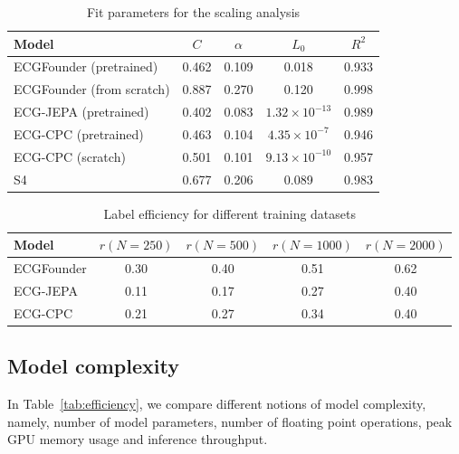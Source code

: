 \documentclass{article}
\begin{document}
        \begin{table}[htbp]
            \centering
            \caption{Fit parameters for the scaling analysis}
            \begin{tabular}{lcccc}
                \toprule
                Model & $C$ & $\alpha$ & $L_0$ & $R^2$ \\
                \midrule
                ECGFounder (pretrained) & 0.462 & 0.109 & 0.018 & 0.933 \\
                ECGFounder (from scratch) & 0.887 & 0.270 & 0.120 & 0.998 \\
                ECG-JEPA (pretrained) & 0.402 & 0.083 & $1.32 \times 10^{-13}$ & 0.989 \\
                ECG-CPC (pretrained) & 0.463 & 0.104 & $4.35 \times 10^{-7}$ & 0.946 \\
                ECG-CPC (scratch) & 0.501 & 0.101 & $9.13 \times 10^{-10}$ & 0.957 \\
                S4 & 0.677 & 0.206 & 0.089 & 0.983 \\
                \bottomrule
            \end{tabular}
            \label{tab:scaling_params}
        \end{table}
        
        \begin{table}[htbp]
            \centering
            \caption{Label efficiency for different training datasets}
            \begin{tabular}{lcccc}
                \toprule
                Model & $r(N=250)$ & $r(N=500)$ & $r(N=1000)$ & $r(N=2000)$ \\
                \midrule
                ECGFounder & 0.30 & 0.40 & 0.51 & 0.62 \\
                ECG-JEPA & 0.11 & 0.17 & 0.27 & 0.40 \\
                ECG-CPC & 0.21 & 0.27 & 0.34 & 0.40 \\
                \bottomrule
            \end{tabular}
            \label{tab:label_efficiency}
        \end{table}
        

        \subsection{Model complexity}
        In Table~\ref{tab:efficiency}, we compare different notions of model complexity, namely, number of model parameters, number of floating point operations, peak GPU memory usage and inference throughput.
        
\end{document}
